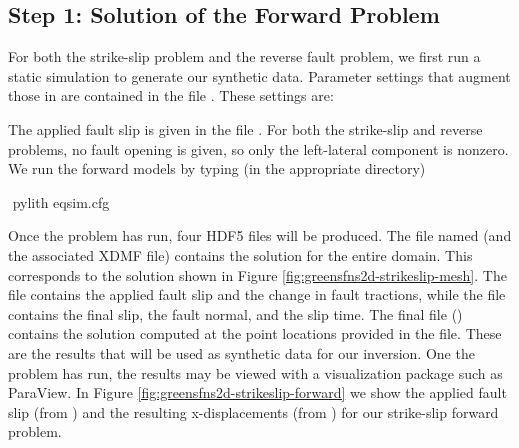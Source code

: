 \subsection{Step 1: Solution of the Forward Problem}

For both the strike-slip problem and the reverse fault problem, we
first run a static simulation to generate our synthetic
data. Parameter settings that augment those in
 are contained in the file
. These settings are:
\begin{inventory}
\end{inventory}
The applied fault slip is given in the file
.  For both the strike-slip and reverse
problems, no fault opening is given, so only the left-lateral
component is nonzero. We run the forward models by typing (in the
appropriate directory)
\begin{shell}
$$ pylith eqsim.cfg
\end{shell}
Once the problem has run, four HDF5 files will be produced. The file
named  (and the associated XDMF file) contains the
solution for the entire domain. This corresponds to the solution shown
in Figure \vref{fig:greensfns2d-strikeslip-mesh}. The
 file contains the applied fault slip and the
change in fault tractions, while the 
file contains the final slip, the fault normal, and the slip time. The
final file () contains the solution computed
at the point locations provided in the 
file. These are the results that will be used as synthetic data for
our inversion. One the problem has run, the results may be viewed with
a visualization package such as ParaView.  In Figure
\vref{fig:greensfns2d-strikeslip-forward} we show the applied fault
slip (from ) and the resulting
x-displacements (from ) for our strike-slip
forward problem.

